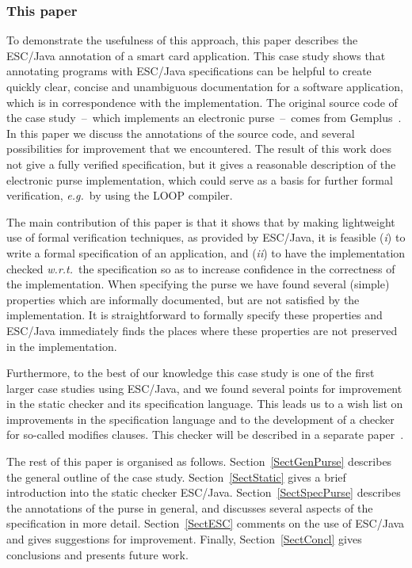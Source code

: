 \documentclass[a4paper]{llncs}
\begin{document}
\subsubsection{This paper}
To demonstrate the usefulness of this approach, this paper describes
the ESC/Java annotation of a smart card application. This case study
shows that annotating programs with ESC/Java specifications can be
helpful to create quickly clear, concise and unambiguous
documentation for a software application, which is in correspondence
with the implementation.  The original source code of the case study~--~which implements an electronic purse~--~comes from
Gemplus~\cite{PurseUrl}. In this paper we discuss the annotations of
the source code, and several possibilities for improvement that we
encountered.  The result of this work does not give a fully verified
specification, but it gives a reasonable description of the electronic
purse implementation, which could serve as a basis for further formal
verification, \emph{e.g.}~by using the LOOP compiler.

The main contribution of this paper is that it shows that by making
light\-weight use of formal verification techniques, as provided by
ESC/Java, it is feasible (\emph{i}) to write a formal specification of
an application, and (\emph{ii}) to have the implementation checked
\emph{w.r.t.}~the specification so as to increase confidence in the
correctness of the implementation. When specifying the purse we have
found several (simple) properties which are informally documented, but
are not satisfied by the implementation. It is straightforward to
formally specify these properties and ESC/Java immediately finds the
places where these properties are not preserved in the implementation.

Furthermore, to the best of our knowledge this case study is one of
the first larger case studies using ESC/Java, and we found several
points for improvement in the static checker and its specification
language. This leads us to a wish list on improvements in the
specification language and to the development of a checker for
so-called modifies clauses. This checker will be described in a
separate paper~\cite{CatanoH02b}.%

The rest of this paper is organised as
follows. Section~\ref{SectGenPurse} describes the general outline of
the case study. Section~\ref{SectStatic} gives a brief introduction
into the static checker ESC/Java.  Section~\ref{SectSpecPurse}
describes the annotations of the purse in general, and discusses
several aspects of the specification in more
detail. Section~\ref{SectESC} comments on the use of ESC/Java and
gives suggestions for improvement. Finally, Section~\ref{SectConcl}
gives conclusions and presents future work.
\end{document}
